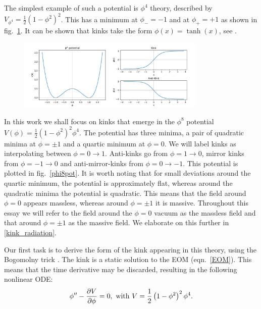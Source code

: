 \documentclass[11pt, oneside]{article}  	%
\numberwithin{equation}{section}
\begin{document}
 The simplest example of such a potential is $\phi^4$ theory, described by $V_{\phi^4} = \frac{1}{2} (1-\phi^2)^2$. This has a minimum at $\phi_{-} = -1$ and at $\phi_{+} = +1$ as shown in fig.~\ref{phi4pot}. It can be shown that kinks take the form $\phi(x) = \tanh(x)$, see \cite{manton-book}.\par
 \begin{figure}
\centering
 \includegraphics[width=0.8\textwidth]{phi4_potential.png}
  \label{phi4pot}
\end{figure}
 In this work we shall focus on kinks that emerge in the $\phi^8$ potential $V(\phi) = \frac{1}{2} \left ( 1 - \phi^2\right)^2 \phi^4$. The potential has three minima, a pair of quadratic minima at $\phi = \pm1$ and a quartic minimum at $\phi= 0$. We will label kinks as interpolating between $\phi = 0 \rightarrow 1$. Anti-kinks go from $\phi = 1 \rightarrow 0$, mirror kinks from $\phi = -1 \rightarrow 0$ and anti-mirror-kinks from $\phi = 0\rightarrow -1$. This potential is plotted in fig.~\ref{phi8pot}. It is worth noting that for small deviations around the quartic minimum, the potential is approximately flat, whereas around the quadratic minima the potential is quadratic. This means that the field around $\phi = 0$ appears massless, whereas around $\phi = \pm1$ it is massive. Throughout this essay we will refer to the field around the $\phi = 0$ vacuum as the massless field and that around $\phi = \pm1$ as the massive field. We elaborate on this further in \textsection \ref{kink_radiation}.\par
 Our first task is to derive the form of the kink appearing in this theory, using the Bogomolny trick \cite{bogomolny}. The kink is a static solution to the EOM (eqn.~\ref{EOM}). This means that the time derivative may be discarded, resulting in the following nonlinear ODE:
 \begin{equation} \label{kink_equation}
 {\phi}'' - \frac{\partial V}{\partial \phi} = 0, \textup{ with } V = \frac{1}{2} \left ( 1 - \phi^2\right)^2 \phi^4.
 \end{equation}
\end{document}

